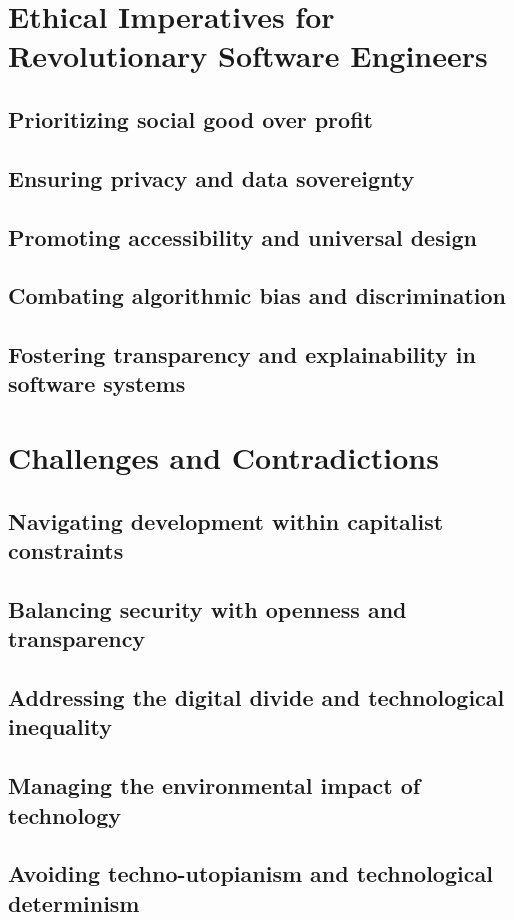 \section{Ethical Imperatives for Revolutionary Software Engineers}
\subsection{Prioritizing social good over profit}
\subsection{Ensuring privacy and data sovereignty}
\subsection{Promoting accessibility and universal design}
\subsection{Combating algorithmic bias and discrimination}
\subsection{Fostering transparency and explainability in software systems}

\newpage

\section{Challenges and Contradictions}
\subsection{Navigating development within capitalist constraints}
\subsection{Balancing security with openness and transparency}
\subsection{Addressing the digital divide and technological inequality}
\subsection{Managing the environmental impact of technology}
\subsection{Avoiding techno-utopianism and technological determinism}

